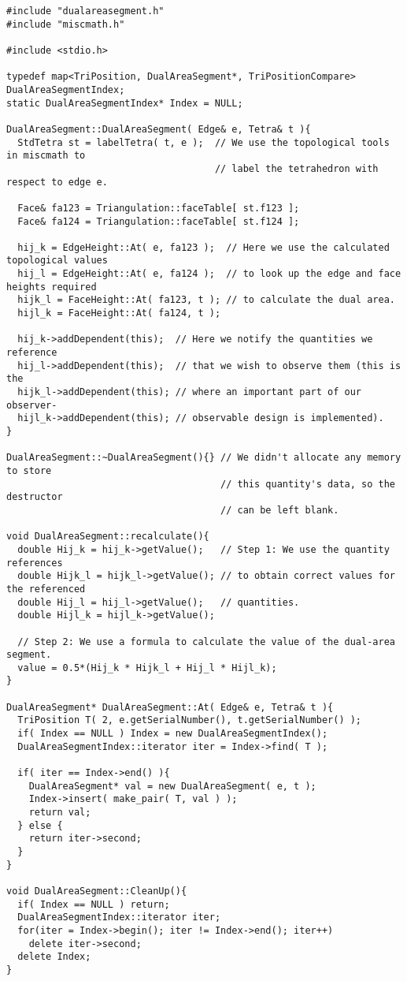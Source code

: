 \documentclass[10pt]{article}%
\begin{document}
{\small{\begin{verbatim} 
#include "dualareasegment.h"
#include "miscmath.h"

#include <stdio.h>

typedef map<TriPosition, DualAreaSegment*, TriPositionCompare> DualAreaSegmentIndex;
static DualAreaSegmentIndex* Index = NULL;

DualAreaSegment::DualAreaSegment( Edge& e, Tetra& t ){
  StdTetra st = labelTetra( t, e );  // We use the topological tools in miscmath to
                                     // label the tetrahedron with respect to edge e.

  Face& fa123 = Triangulation::faceTable[ st.f123 ];
  Face& fa124 = Triangulation::faceTable[ st.f124 ];

  hij_k = EdgeHeight::At( e, fa123 );  // Here we use the calculated topological values
  hij_l = EdgeHeight::At( e, fa124 );  // to look up the edge and face heights required
  hijk_l = FaceHeight::At( fa123, t ); // to calculate the dual area.
  hijl_k = FaceHeight::At( fa124, t );

  hij_k->addDependent(this);  // Here we notify the quantities we reference
  hij_l->addDependent(this);  // that we wish to observe them (this is the            
  hijk_l->addDependent(this); // where an important part of our observer-
  hijl_k->addDependent(this); // observable design is implemented).
}

DualAreaSegment::~DualAreaSegment(){} // We didn't allocate any memory to store
                                      // this quantity's data, so the destructor 
                                      // can be left blank.

void DualAreaSegment::recalculate(){
  double Hij_k = hij_k->getValue();   // Step 1: We use the quantity references
  double Hijk_l = hijk_l->getValue(); // to obtain correct values for the referenced
  double Hij_l = hij_l->getValue();   // quantities.
  double Hijl_k = hijl_k->getValue();

  // Step 2: We use a formula to calculate the value of the dual-area segment.
  value = 0.5*(Hij_k * Hijk_l + Hij_l * Hijl_k); 
}

DualAreaSegment* DualAreaSegment::At( Edge& e, Tetra& t ){
  TriPosition T( 2, e.getSerialNumber(), t.getSerialNumber() );
  if( Index == NULL ) Index = new DualAreaSegmentIndex();
  DualAreaSegmentIndex::iterator iter = Index->find( T );

  if( iter == Index->end() ){
    DualAreaSegment* val = new DualAreaSegment( e, t );
    Index->insert( make_pair( T, val ) );
    return val;
  } else {
    return iter->second;
  }
}

void DualAreaSegment::CleanUp(){
  if( Index == NULL ) return;
  DualAreaSegmentIndex::iterator iter;
  for(iter = Index->begin(); iter != Index->end(); iter++)
    delete iter->second;
  delete Index;
}

\end{verbatim}
}}
\end{document}
